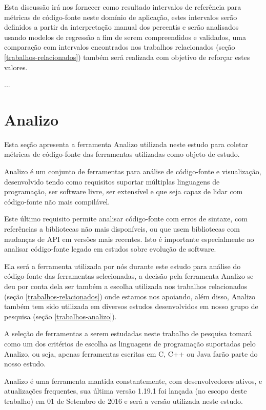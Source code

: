 Esta discussão irá nos fornecer como resultado intervalos de referência para
métricas de código-fonte neste domínio de aplicação, estes intervalos serão
definidos a partir da interpretação manual dos percentis e serão analisados
usando modelos de regressão a fim de serem compreendidos e validados, uma
comparação com intervalos encontrados nos trabalhos relacionados (seção
\ref{trabalhos-relacionados}) também será realizada com objetivo de reforçar
estes valores.

...

\section{Analizo} \label{analizo}

Esta seção apresenta a ferramenta Analizo utilizada neste estudo para
coletar métricas de código-fonte das ferramentas utilizadas como objeto de
estudo.

Analizo é um conjunto de ferramentas para análise de código-fonte e
visualização, desenvolvido tendo como requisitos suportar múltiplas linguagens
de programação, ser software livre, ser extensível e que seja capaz de lidar
com código-fonte não mais compilável.

Este último requisito permite analisar código-fonte com erros de sintaxe, com
referências a bibliotecas não mais disponíveis, ou que usem bibliotecas com
mudanças de API em versões mais recentes. Isto é importante especialmente ao
analisar código-fonte legado em estudos sobre evolução de software.

Ela será a ferramenta utilizada por nós durante este estudo para análise do
código-fonte das ferramentas selecionadas, a decisão pela ferramenta Analizo
se deu por conta dela ser também a escolha utilizada nos trabalhos
relacionados (seção \ref{trabalhos-relacionados}) onde estamos nos apoiando,
além disso, Analizo também tem sido utilizada em diversos estudos
desenvolvidos em nosso grupo de pesquisa (seção \ref{trabalhos-analizo}).

A seleção de ferramentas a serem estudadas neste trabalho de pesquisa tomará
como um dos critérios de escolha as linguagens de programação suportadas pelo
Analizo, ou seja, apenas ferramentas escritas em C, C++ ou Java farão parte do
nosso estudo.

Analizo é uma ferramenta mantida constantemente, com desenvolvedores ativos, e
atualizações frequentes, sua última versão 1.19.1 foi lançada (no escopo deste
trabalho) em 01 de Setembro de 2016 e será a versão utilizada neste estudo.

